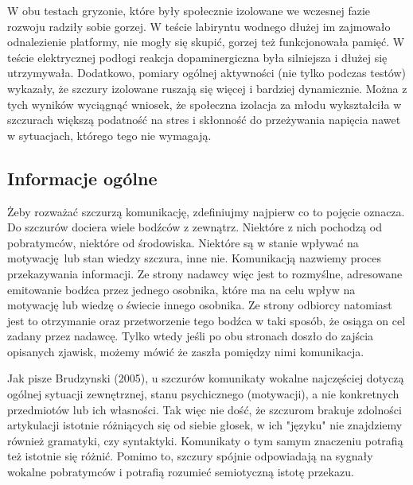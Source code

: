 \documentclass{psychol}
\begin{document}
W obu testach gryzonie, które były społecznie izolowane we wczesnej fazie rozwoju radziły sobie gorzej. W teście labiryntu wodnego dłużej im zajmowało odnalezienie platformy, nie mogły się skupić, gorzej też funkcjonowała pamięć. W teście elektrycznej podłogi reakcja dopaminergiczna była silniejsza i dłużej się utrzymywała. Dodatkowo, pomiary ogólnej aktywności (nie tylko podczas testów) wykazały, że szczury izolowane ruszają się więcej i bardziej dynamicznie. Można z tych wyników wyciągnąć wniosek, że społeczna izolacja za młodu wykształciła w szczurach większą podatność na stres i skłonność do przeżywania napięcia nawet w sytuacjach, którego tego nie wymagają.


\subsection{Informacje ogólne}

Żeby rozważać szczurzą komunikację, zdefiniujmy najpierw co to pojęcie oznacza. Do szczurów dociera wiele bodźców z zewnątrz. Niektóre z nich pochodzą od pobratymców, niektóre od środowiska. Niektóre są w stanie wpływać na motywację lub stan wiedzy szczura, inne nie. Komunikacją nazwiemy proces przekazywania informacji. Ze strony nadawcy więc jest to rozmyślne, adresowane emitowanie bodźca przez jednego osobnika, które ma na celu wpływ na motywację lub wiedzę o świecie innego osobnika. Ze strony odbiorcy natomiast jest to otrzymanie oraz przetworzenie tego bodźca w taki sposób, że osiąga on cel zadany przez nadawcę. Tylko wtedy jeśli po obu stronach doszło do zajścia opisanych zjawisk, możemy mówić że zaszła pomiędzy nimi komunikacja.

Jak pisze Brudzynski (2005), u szczurów komunikaty \colorbox{yellow!30}{wokalne} najczęściej dotyczą ogólnej sytuacji zewnętrznej, stanu psychicznego (motywacji), a nie konkretnych przedmiotów lub ich własności. Tak więc nie dość, że szczurom brakuje zdolności artykulacji istotnie różniących się od siebie głosek, w ich "języku" nie znajdziemy również gramatyki, czy syntaktyki. Komunikaty o tym samym znaczeniu potrafią też istotnie się różnić. Pomimo to, szczury spójnie odpowiadają na sygnały wokalne pobratymców i potrafią rozumieć semiotyczną istotę przekazu.
\end{document}
